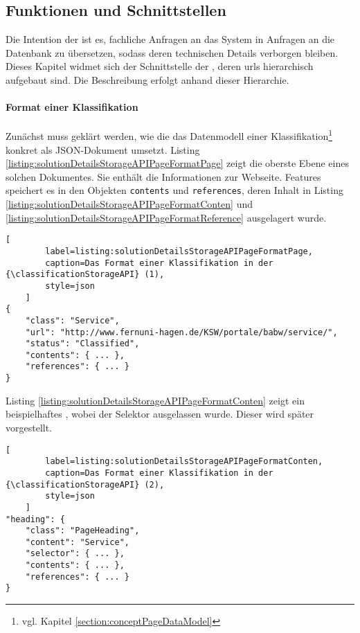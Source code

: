 \subsection{Funktionen und Schnittstellen}
    Die Intention der {\classificationStorageAPI} ist es,
    fachliche Anfragen an das System in Anfragen an die Datenbank zu übersetzen,
    sodass deren technischen Details verborgen bleiben.
    Dieses Kapitel widmet sich der Schnittstelle der {\classificationStorageAPI},
    deren \glspl{url} hierarchisch aufgebaut sind.
    Die Beschreibung erfolgt anhand dieser Hierarchie.

    \paragraph*{Format einer Klassifikation}
    Zunächst muss geklärt werden, wie die {\classificationStorageAPI} das Datenmodell einer
    Klassifikation\footnote{vgl. Kapitel \ref{section:conceptPageDataModel}} konkret als JSON-Dokument umsetzt.
    Listing \ref{listing:solutionDetailsStorageAPIPageFormatPage} zeigt die oberste Ebene eines solchen Dokumentes.
    Sie enthält die Informationen zur Webseite.
    Features speichert es in den Objekten \texttt{contents} und \texttt{references},
    deren Inhalt in Listing \ref{listing:solutionDetailsStorageAPIPageFormatConten}
    und \ref{listing:solutionDetailsStorageAPIPageFormatReference} ausgelagert wurde.

    \begin{lstlisting}[
        label=listing:solutionDetailsStorageAPIPageFormatPage,
        caption=Das Format einer Klassifikation in der {\classificationStorageAPI} (1),
        style=json
    ]
{
    "class": "Service",
    "url": "http://www.fernuni-hagen.de/KSW/portale/babw/service/",
    "status": "Classified",
    "contents": { ... },
    "references": { ... }
}
    \end{lstlisting}

    Listing \ref{listing:solutionDetailsStorageAPIPageFormatConten}
    zeigt ein beispielhaftes {\contentFeature},
    wobei der Selektor ausgelassen wurde.
    Dieser wird später vorgestellt.

    \begin{lstlisting}[
        label=listing:solutionDetailsStorageAPIPageFormatConten,
        caption=Das Format einer Klassifikation in der {\classificationStorageAPI} (2),
        style=json
    ]
"heading": {
    "class": "PageHeading",
    "content": "Service",
    "selector": { ... },
    "contents": { ... },
    "references": { ... }
}
    \end{lstlisting}

